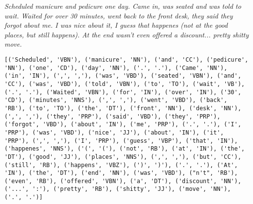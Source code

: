 \textit{Scheduled manicure and pedicure one day. Came in, was seated and was told to wait. Waited for over 30 minutes, went back to the front desk, they said they forgot about me. I was nice about it, I guess that happenes (not at the good places, but still happens). At the end wasn't even offered a discount... pretty shitty move.}\\

\begin{Verbatim}[breaklines=true, breakanywhere=true] 
[('Scheduled', 'VBN'), ('manicure', 'NN'), ('and', 'CC'), ('pedicure', 'NN'), ('one', 'CD'), ('day', 'NN'), ('.', '.'), ('Came', 'NN'), ('in', 'IN'), (',', ','), ('was', 'VBD'), ('seated', 'VBN'), ('and', 'CC'), ('was', 'VBD'), ('told', 'VBN'), ('to', 'TO'), ('wait', 'VB'), ('.', '.'), ('Waited', 'VBN'), ('for', 'IN'), ('over', 'IN'), ('30', 'CD'), ('minutes', 'NNS'), (',', ','), ('went', 'VBD'), ('back', 'RB'), ('to', 'TO'), ('the', 'DT'), ('front', 'NN'), ('desk', 'NN'), (',', ','), ('they', 'PRP'), ('said', 'VBD'), ('they', 'PRP'), ('forgot', 'VBD'), ('about', 'IN'), ('me', 'PRP'), ('.', '.'), ('I', 'PRP'), ('was', 'VBD'), ('nice', 'JJ'), ('about', 'IN'), ('it', 'PRP'), (',', ','), ('I', 'PRP'), ('guess', 'VBP'), ('that', 'IN'), ('happenes', 'NNS'), ('(', '('), ('not', 'RB'), ('at', 'IN'), ('the', 'DT'), ('good', 'JJ'), ('places', 'NNS'), (',', ','), ('but', 'CC'), ('still', 'RB'), ('happens', 'VBZ'), (')', ')'), ('.', '.'), ('At', 'IN'), ('the', 'DT'), ('end', 'NN'), ('was', 'VBD'), ("n't", 'RB'), ('even', 'RB'), ('offered', 'VBN'), ('a', 'DT'), ('discount', 'NN'), ('...', ':'), ('pretty', 'RB'), ('shitty', 'JJ'), ('move', 'NN'), ('.', '.')]
\end{Verbatim}

